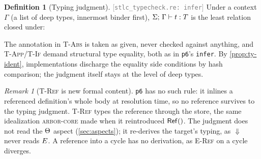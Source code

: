 \documentclass[11pt]{article}
\theoremstyle{definition}
\newtheorem{definition}{Definition}[section]
\theoremstyle{plain}
\theoremstyle{remark}
\newtheorem{remark}{Remark}[section]
\newcommand{\src}[1]{{\footnotesize\textcolor{gray}{[\texttt{#1}]}}}
\newcommand{\arborcore}{\textsc{arbor-core}}
\begin{document}
\begin{definition}[Typing judgment]\label{def:typing}
\src{stlc\_typecheck.re: infer} Under a context $\Gamma$ (a list of deep types, innermost
binder first), $\Sigma;\,\Gamma \vdash t : T$ is the least relation closed under:
The annotation in \textsc{T-Abs} is taken as given, never checked against anything, and
\textsc{T-App}/\textsc{T-If} demand structural type equality, both as in \texttt{p6}'s
\texttt{infer}. By \cref{prop:ty-ident}, implementations discharge the equality side
conditions by hash comparison; the judgment itself stays at the level of deep types.
\end{definition}

\begin{remark}[\textsc{T-Ref} is new formal content]\label{rem:tref}
\texttt{p6} has no such rule: it inlines a referenced definition's whole body at resolution
time, so no reference survives to the typing judgment. \textsc{T-Ref} types the reference
through the store, the same idealization \arborcore{} made when it reintroduced $\mathsf{Ref}()$.
The judgment does not read the $\Theta$ aspect (\cref{sec:aspects}); it re-derives the
target's typing, as $\Downarrow$ never reads $E$. A reference into a cycle has no
derivation, as \textsc{E-Ref} on a cycle diverges.
\end{remark}
\end{document}
